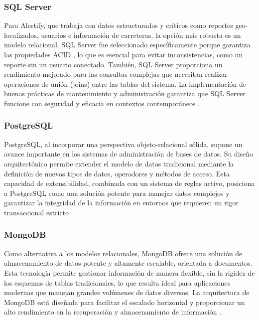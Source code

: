 \subsubsection*{\hspace{0.7cm}SQL Server}
Para Alertify, que trabaja con datos estructurados y críticos como reportes geo-localizados, usuarios e información de carreteras, la opción más robusta es un modelo relacional. SQL Server fue seleccionado específicamente porque garantiza las propiedades ACID \cite{meier2019sql}, lo que es esencial para evitar inconsistencias, como un reporte sin un usuario conectado. También, SQL Server proporciona un rendimiento mejorado para las consultas complejas que necesitan realizar operaciones de unión (joins) entre las tablas del sistema. La implementación de buenas prácticas de mantenimiento y administración garantiza que SQL Server funcione con seguridad y eficacia en contextos contemporáneos \cite{vellanki2025sql}.

\subsubsection*{\hspace{0.7cm}PostgreSQL}
PostgreSQL, al incorporar una perspectiva objeto-relacional sólida, supone un avance importante en los sistemas de administración de bases de datos. Su diseño arquitectónico permite extender el modelo de datos tradicional mediante la definición de nuevos tipos de datos, operadores y métodos de acceso. Esta capacidad de extensibilidad, combinada con un sistema de reglas activo, posiciona a PostgreSQL como una solución potente para manejar datos complejos y garantizar la integridad de la información en entornos que requieren un rigor transaccional estricto \cite{stonebraker1986design}.

\subsubsection*{\hspace{0.7cm}MongoDB}
Como alternativa a los modelos relacionales, MongoDB ofrece una solución de almacenamiento de datos potente y altamente escalable, orientada a documentos. Esta tecnología permite gestionar información de manera flexible, sin la rigidez de los esquemas de tablas tradicionales, lo que resulta ideal para aplicaciones modernas que manejan grandes volúmenes de datos diversos. La arquitectura de MongoDB está diseñada para facilitar el escalado horizontal y proporcionar un alto rendimiento en la recuperación y almacenamiento de información \cite{bradshaw2019mongodb}.

